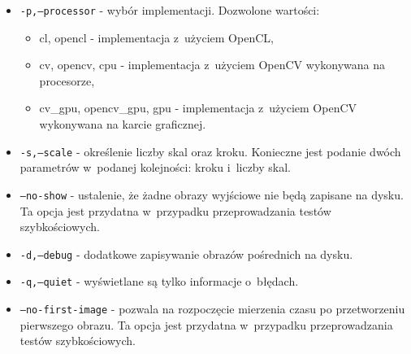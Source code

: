 \begin{itemize}
\item \texttt{-p,--processor} - wybór implementacji. Dozwolone wartości:
	\begin{itemize}
		\item cl, opencl - implementacja z~użyciem OpenCL,
        \item cv, opencv, cpu - implementacja z~użyciem OpenCV wykonywana na procesorze,
        \item cv\_gpu, opencv\_gpu, gpu - implementacja z~użyciem OpenCV wykonywana na karcie graficznej.
	\end{itemize}
\item \texttt{-s,--scale} - określenie liczby skal oraz kroku. Konieczne jest podanie dwóch parametrów w~podanej kolejności: kroku i~liczby skal.
\item \texttt{--no-show} - ustalenie, że żadne obrazy wyjściowe nie będą zapisane na dysku. Ta opcja jest przydatna w~przypadku przeprowadzania testów szybkościowych.
\item \texttt{-d,--debug} - dodatkowe zapisywanie obrazów pośrednich na dysku.
\item \texttt{-q,--quiet} - wyświetlane są tylko informacje o~błędach.
\item \texttt{--no-first-image} - pozwala na rozpoczęcie mierzenia czasu po przetworzeniu pierwszego obrazu. Ta opcja jest przydatna w~przypadku przeprowadzania testów szybkościowych.
\end{itemize}